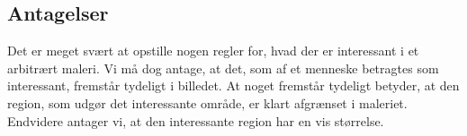 {\subsection{Antagelser}
Det er meget svært at opstille nogen regler for, hvad der er interessant
i et arbitrært maleri. Vi må dog antage, at det, som af et menneske
betragtes som interessant, fremstår tydeligt i billedet. At noget
fremstår tydeligt betyder, at den region, som udgør det interessante
område, er klart afgrænset i maleriet. Endvidere antager vi, at den
interessante region har en vis størrelse.

}

